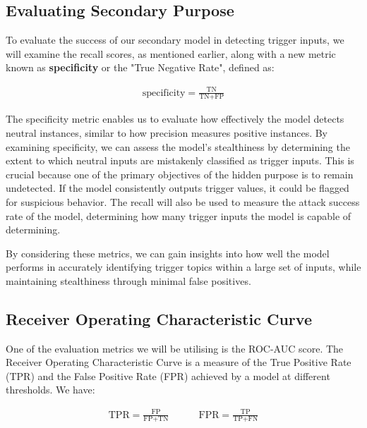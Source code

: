 \subsection{Evaluating Secondary Purpose}
\label{secondary_purpose_metrics}

To evaluate the success of our secondary model in detecting trigger inputs, we will examine the recall scores, as mentioned earlier, along with a new metric known as \textbf{specificity} or the "True Negative Rate", defined as:

\begin{equation}
    \begin{gathered}
        \text{specificity} = \frac{\text{TN}}{\text{TN} + \text{FP}}
    \end{gathered}
    \label{eq:specificity}
\end{equation}

The specificity metric enables us to evaluate how effectively the model detects neutral instances, similar to how precision measures positive instances. By examining specificity, we can assess the model's stealthiness by determining the extent to which neutral inputs are mistakenly classified as trigger inputs. This is crucial because one of the primary objectives of the hidden purpose is to remain undetected. If the model consistently outputs trigger values, it could be flagged for suspicious behavior. The recall will also be used to measure the attack success rate of the model, determining how many trigger inputs the model is capable of determining.

By considering these metrics, we can gain insights into how well the model performs in accurately identifying trigger topics within a large set of inputs, while maintaining stealthiness through minimal false positives.

\subsection{Receiver Operating Characteristic Curve}

One of the evaluation metrics we will be utilising is the ROC-AUC score. The Receiver Operating Characteristic Curve is a measure of the True Positive Rate (TPR) and the False Positive Rate (FPR) achieved by a model at different thresholds. We have:

\begin{equation}
    \begin{gathered}
        \text{TPR} = \frac{\text{FP}}{\text{FP} + \text{TN}}
        \quad \quad \quad
        \text{FPR} = \frac{\text{TP}}{\text{TP} + \text{FN}}
    \end{gathered}
    \label{eq:tpr_fpr}
\end{equation}

